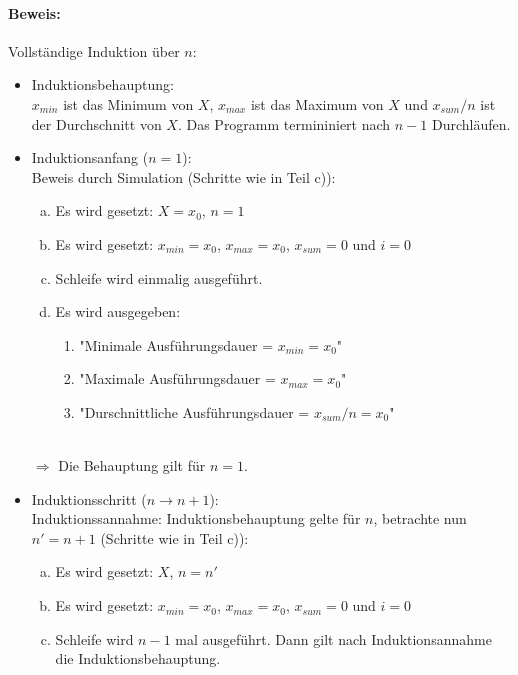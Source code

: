 \documentclass{article}
\begin{document}
    \paragraph*{Beweis:}
    Vollständige Induktion über $n$:
    \begin{itemize}
        \item Induktionsbehauptung: \\
        $x_{min}$ ist das Minimum von $X$, $x_{max}$ ist das Maximum von $X$ und $x_{sum}/n$ ist der Durchschnitt von $X$. Das Programm termininiert nach $n-1$ Durchläufen.
        \item Induktionsanfang ($n=1$): \\
        Beweis durch Simulation (Schritte wie in Teil c)): 
        \begin{enumerate}[(a)]
            \item Es wird gesetzt: $X={x_0}$, $n=1$
            \item Es wird gesetzt: $x_{min}=x_0$, $x_{max}=x_0$, $x_{sum}=0$ und $i=0$
            \item Schleife wird einmalig ausgeführt. 
            \item Es wird ausgegeben: 
            \begin{enumerate}
                \item "Minimale Ausführungsdauer = $x_{min}=x_0$"
                \item "Maximale Ausführungsdauer = $x_{max}=x_0$"
                \item "Durschnittliche Ausführungsdauer = $x_{sum}/n=x_0$"
            \end{enumerate}
        \end{enumerate} \\
            $\Rightarrow$ Die Behauptung gilt für $n=1$.
        \item Induktionsschritt ($n \rightarrow n+1$): \\
        Induktionssannahme: Induktionsbehauptung gelte für $n$, betrachte nun $n' = n+1$ (Schritte wie in Teil c)):\\
        \begin{enumerate}[(a)]
            \item Es wird gesetzt: $X$, $n=n'$
            \item Es wird gesetzt: $x_{min}=x_0$, $x_{max}=x_0$, $x_{sum}=0$ und $i=0$
            \item Schleife wird $n-1$ mal ausgeführt. Dann gilt nach Induktionsannahme die Induktionsbehauptung. \\

\end{enumerate}
\end{itemize}
\end{document}
